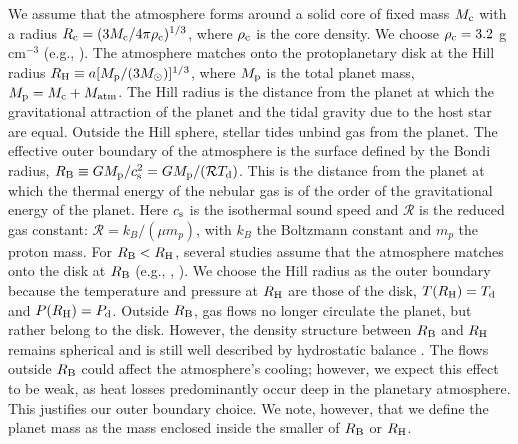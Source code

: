 \documentclass[apj]{emulateapj}
\newcommand{\co}{_{\rm c}}
\newcommand{\di}{_{\rm d}}
\begin{document}
We assume that the atmosphere forms around a solid core of fixed mass $M_{\rm c}$ with a radius $R_{\rm c}=(3 M_{\rm c}/4 \pi \rho_{\rm c})^{1/3}$, where $\rho_{\rm c}$ is the core density. We choose $\rho_{\rm c}=3.2$ g cm$^{-3}$ (e.g., \citealt{pap99}). The atmosphere matches onto the protoplanetary disk at the Hill radius $R_{\rm H} \equiv a [M_{\rm p} / (3 M_{\odot})]^{1/3}$, where $M_{\rm p}$ is the total planet mass, $M_{\rm p}=M\co+M_{\rm atm}$. The Hill radius is the distance from the planet at which the gravitational attraction of the planet and the tidal gravity due to the host star are equal. Outside the Hill sphere, stellar tides unbind gas from the planet. The effective outer boundary of the atmosphere is the surface defined by the Bondi radius, $R_{\rm B} \equiv G M_{\rm p}/c_{\rm s}^2=G M_{\rm p} / (\mathcal{R} T\di)$. This is the distance from the planet at which the thermal energy of the nebular gas is of the order of the gravitational energy of the planet. Here $c_{\rm s}$ is the isothermal sound speed and $\mathcal{R}$ is the reduced gas constant: $\mathcal{R}=k_B/(\mu m_p)$, with $k_B$ the Boltzmann constant and $m_p$ the proton mass. For $R_{\rm B}<R_{\rm H}$, several studies assume that the atmosphere matches onto the disk at $R_{\rm B}$ (e.g., \citealt{ikoma00}, \citealt{pollack96}). We choose the Hill radius as the outer boundary because the temperature and pressure at $R_{\rm H}$ are those of the disk,  $T(R_{\rm H})=T_{\rm d}$ and $P(R_{\rm H})=P_{\rm d}$. Outside $R_{\rm B}$, gas flows no longer circulate the planet, but rather belong to the disk. However, the density structure between $R_{\rm B}$ and $R_{\rm H}$ remains spherical and is still well described by hydrostatic balance \citep{ormel13}. The flows outside $R_{\rm B}$ could affect the atmosphere's cooling; however, we expect this effect to be weak, as heat losses predominantly occur deep in the planetary atmosphere. This justifies our outer boundary choice. We note, however, that we define the planet mass as the mass enclosed inside the smaller of $R_{\rm B}$ or $R_{\rm H}$.


\end{document}
